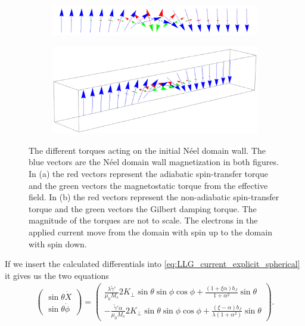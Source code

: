 \documentclass[12pt, a4paper]{article}		%
\numberwithin{equation}{section}
\begin{document}
\begin{figure}[h!]
\centering
\begin{subfigure}{\textwidth}
  \centering
  \includegraphics[width=1.0\linewidth]{Figures/NeelWallAdSTTHeff.png}
  \caption{}
  \label{fig:Neel_AdSTT_Heff}
\end{subfigure}
\begin{subfigure}{\textwidth}
  \centering
  \includegraphics[width=1.0\linewidth]{Figures/NeelWallNonAdSTTGD.png}
  \caption{}
  \label{fig:Neel_NonAdSTT_GD}
\end{subfigure}
\caption{The different torques acting on the initial N\'{e}el domain wall. The blue vectors are the N\'{e}el domain wall magnetization in both figures. In (a) the red vectors represent the adiabatic spin-transfer torque and the green vectors the magnetostatic torque from the effective field. In (b) the red vectors represent the non-adiabatic spin-transfer torque and the green vectors the Gilbert damping torque. The magnitude of the torques are not to scale. The electrons in the applied current move from the domain with spin up to the domain with spin down.}
\end{figure}
If we insert the calculated differentials into \eqref{eq:LLG_current_explicit_spherical} it gives us the two equations
\begin{align}
\begin{pmatrix}
\sin\theta\dot{X} \\ \sin\theta\dot{\phi}
\end{pmatrix}
=
\begin{pmatrix}
\frac{\lambda \tilde{\gamma}'}{\mu_0 M_s} 2 K_{\perp} \sin\theta\sin\phi\cos\phi + \frac{(1+\xi\alpha)b_J}{1+\alpha^2}\sin\theta \\
-\frac{\tilde{\gamma}'\alpha}{\mu_0 M_s}2 K_{\perp} \sin\theta\sin\phi\cos\phi + \frac{(\xi-\alpha)b_J}{\lambda(1+\alpha^2)}\sin\theta
\end{pmatrix}.
\end{align}
\end{document}
